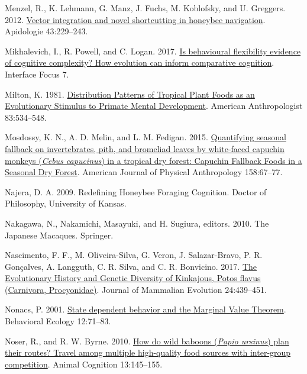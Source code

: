 \documentclass[twoside,12pt,final]{ucthesis-CA2012}
\newenvironment{CSLReferences}%
  {}%
  {\par}
\begin{document}
\begin{ucmainmatter}
\begin{CSLReferences}{1}{0}
\leavevmode{}%
Menzel, R., K. Lehmann, G. Manz, J. Fuchs, M. Koblofsky, and U. Greggers. 2012. \href{https://doi.org/10.1007/s13592-012-0127-z}{Vector integration and novel shortcutting in honeybee navigation}. Apidologie 43:229--243.

\leavevmode{}%
Mikhalevich, I., R. Powell, and C. Logan. 2017. \href{https://doi.org/10.1098/rsfs.2016.0121}{Is behavioural flexibility evidence of cognitive complexity? How evolution can inform comparative cognition}. Interface Focus 7.

\leavevmode{}%
Milton, K. 1981. \href{https://doi.org/10.1525/aa.1981.83.3.02a00020}{Distribution Patterns of Tropical Plant Foods as an Evolutionary Stimulus to Primate Mental Development}. American Anthropologist 83:534--548.

\leavevmode{}%
Mosdossy, K. N., A. D. Melin, and L. M. Fedigan. 2015. \href{https://doi.org/10.1002/ajpa.22767}{Quantifying seasonal fallback on invertebrates, pith, and bromeliad leaves by white-faced capuchin monkeys (\emph{Cebus capucinus}) in a tropical dry forest: Capuchin Fallback Foods in a Seasonal Dry Forest}. American Journal of Physical Anthropology 158:67--77.

\leavevmode{}%
Najera, D. A. 2009. Redefining Honeybee Foraging Cognition. Doctor of Philosophy, University of Kansas.

\leavevmode{}%
Nakagawa, N., Nakamichi, Masayuki, and H. Sugiura, editors. 2010. The Japanese Macaques. Springer.

\leavevmode{}%
Nascimento, F. F., M. Oliveira-Silva, G. Veron, J. Salazar-Bravo, P. R. Gonçalves, A. Langguth, C. R. Silva, and C. R. Bonvicino. 2017. \href{https://doi.org/10.1007/s10914-016-9354-9}{The Evolutionary History and Genetic Diversity of Kinkajous, Potos flavus (Carnivora, Procyonidae)}. Journal of Mammalian Evolution 24:439--451.

\leavevmode{}%
Nonacs, P. 2001. \href{https://doi.org/10.1093/oxfordjournals.beheco.a000381}{State dependent behavior and the Marginal Value Theorem}. Behavioral Ecology 12:71--83.

\leavevmode{}%
Noser, R., and R. W. Byrne. 2010. \href{https://doi.org/10.1007/s10071-009-0254-8}{How do wild baboons (\emph{Papio ursinus}) plan their routes? Travel among multiple high-quality food sources with inter-group competition}. Animal Cognition 13:145--155.


\end{CSLReferences}
\end{ucmainmatter}
\end{document}
